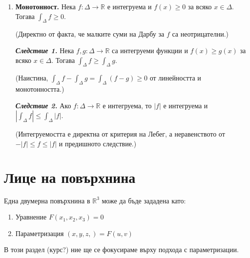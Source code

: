 \documentclass[11pt]{article}
\numberwithin{equation}{section}
\numberwithin{figure}{section}
\numberwithin{table}{section}
\theoremstyle{plain}
\theoremstyle{definition}
\theoremstyle{remark}
\theoremstyle{definition}
\theoremstyle{remark}
\theoremstyle{plain}
\theoremstyle{definition}
\theoremstyle{definition}
\theoremstyle{plain}
\theoremstyle{plain}
\theoremstyle{plain}
\theoremstyle{definition}
\theoremstyle{plain}
\newcommand*{\R}{\mathbb{R}}
\begin{document}
\begin{enumerate}
\item \textbf{Монотонност.} Нека $f:\Delta\longrightarrow\R$ е интегруема и $f(x)\ge 0$ за всяко $x\in \Delta$. Тогава $\int_\Delta f \ge 0$. 

(Директно от факта, че малките суми на Дарбу за $f$ са неотрицателни.)

\textbf{\textit{Следствие 1.}} Нека $f, g: \Delta \longrightarrow\R$ са интегруеми функции и $f(x)\ge g(x)$ за всяко $x\in \Delta$. Тогава $\int_\Delta f \ge \int_\Delta g$.

(Наистина, $\int_\Delta f - \int_\Delta g=\int_\Delta (f -g) \ge 0$ от линейността и монотонността.)

\textbf{\textit{Следствие 2.}} Ако $f:\Delta\longrightarrow\R$ е интегруема, то $|f|$ е интегруема и $|\int_\Delta f|\le \int_\Delta |f|$.

(Интегруемостта е директна от критерия на Лебег, а неравенството от $-|f|\le f\le |f|$ и предишното следствие.)
\end{enumerate}

\section{}

\section{}

\section{}

\section{}

\section{Лице на повърхнина}

Една двумерна повърхнина в $\R^3$ може да бъде зададена като:
\begin{enumerate}
\item Уравнение $F(x_1, x_2, x_3) = 0$
\item Параметризация $(x,y,z,) = F(u,v)$
\end{enumerate}

В този раздел (курс?) ние ще се фокусираме върху подхода с параметризации.
\end{document}
